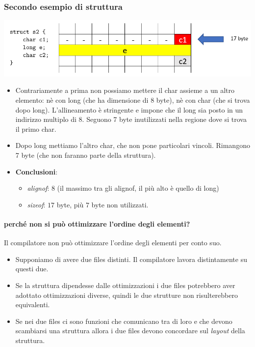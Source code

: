 \documentclass[11pt]{report}
\theoremstyle{definition}
\begin{document}
\subsubsection{Secondo esempio di struttura}
\begin{center}
\includegraphics[scale=0.80]{img/17.PNG}
\end{center} 
\begin{itemize}
\item Contrariamente a prima non possiamo mettere il char assieme a un altro elemento: nè con long (che ha dimensione di 8 byte), nè con char (che si trova dopo long). L'allineamento è stringente e impone che il long sia posto in un indirizzo multiplo di 8. Seguono 7 byte inutilizzati nella regione dove si trova il primo char.
\item Dopo long mettiamo l'altro char, che non pone particolari vincoli. Rimangono 7 byte (che non faranno parte della struttura).
\item \textbf{Conclusioni}:\begin{itemize}
\item \emph{alignof}: $8$ (il massimo tra gli alignof, il più alto è quello di long)
\item \emph{sizeof}: $17$ byte, più $7$ byte non utilizzati.
\end{itemize}
\end{itemize}

\paragraph{perché non si può ottimizzare l'ordine degli elementi?} Il compilatore non può ottimizzare l'ordine degli elementi per conto suo. 
\begin{itemize}
\item Supponiamo di avere due files distinti. Il compilatore lavora distintamente su questi due. 
\item Se la struttura dipendesse dalle ottimizzazioni i due files potrebbero aver adottato ottimizzazioni diverse, quindi le due strutture non risulterebbero equivalenti.
\item Se nei due files ci sono funzioni che comunicano tra di loro e che devono scambiarsi una struttura allora i due files devono concordare sul \emph{layout} della struttura.
\end{itemize}
\end{document}
